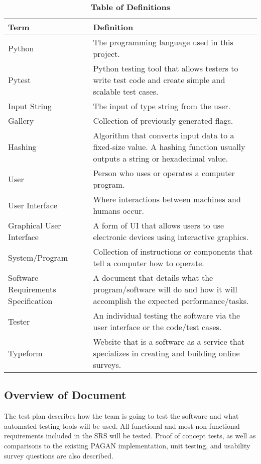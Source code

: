 \documentclass[12pt, titlepage]{article}
\newcommand{\newterm}[1]{\label{Term:#1} \MakeUppercase #1}
\begin{document}
\newpage
\begin{table}[htbp]
\caption{\textbf{Table of Definitions}} \label{def}

\begin{tabularx}{\textwidth}{p{3cm}X}
\toprule
\textbf{Term} & \textbf{Definition}\\
\midrule
    \newterm{Python} & The programming language used in this project.\\
    \hline
    \newterm{Pytest} & Python testing tool that allows testers to write test
    code and create simple and scalable test cases.\\
    \hline
    \newterm{Input String} & The input of type string from the user.\\
    \hline
    \newterm{Gallery} & Collection of previously generated flags.\\
    \hline
    \newterm{Hashing} & Algorithm that converts input data to a fixed-size
    value. A hashing function usually outputs a string or hexadecimal value.\\
    \hline
    \newterm{User} & Person who uses or operates a computer program.\\
    \hline
    \newterm{User Interface} & Where interactions between machines and humans
    occur.\\
    \hline
    \newterm{Graphical User Interface} & A form of UI that allows users to use
    electronic devices using interactive graphics.\\
    \hline
    \newterm{System/Program} & Collection of instructions or components that
    tell a computer how to operate.\\
    \hline
    \newterm{Software Requirements Specification} & A document that details
    what the program/software will do and how it will accomplish the expected
    performance/tasks.\\
    \hline
    \newterm{Tester} & An individual testing the software via the user
    interface or the code/test cases.\\
    \hline
    \newterm{Typeform} & Website that is a software as a service that
    specializes in creating and building online surveys.\\

\bottomrule
\end{tabularx}
    
\end{table} 

\newpage
\FloatBarrier
\subsection{Overview of Document}
The test plan describes how the team is going to test the software and what
automated testing tools will be used. All functional and most non-functional
requirements included in the SRS will be tested. Proof of concept tests, as
well as comparisons to the existing PAGAN implementation, unit testing, and
usability survey questions are also described.
\end{document}
